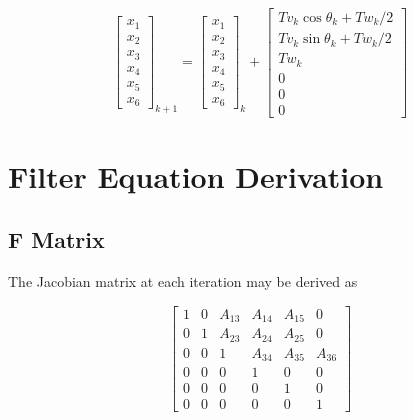 \documentclass[11pt]{amsart}
\begin{document}
\begin{equation}
\begin{bmatrix}
x_1 \\ x_2 \\ x_3 \\ x_4 \\ x_5 \\ x_6 
\end{bmatrix}_{k+1} = 
\begin{bmatrix}
x_1 \\ x_2 \\ x_3 \\ x_4 \\ x_5 \\ x_6 
\end{bmatrix}_{k} +
\begin{bmatrix}
T v_k \cos{\theta_k + T w_k/2} \\
T v_k \sin{\theta_k + T w_k/2} \\
T w_k \\ 0 \\ 0 \\ 0
\end{bmatrix} 
 \end{equation}
 
 \newpage
\section{Filter Equation Derivation}
\subsection{F Matrix}
The Jacobian matrix at each iteration may be derived as

\begin{equation}
\begin{bmatrix}
1 & 0 & A_{13} & A_{14} & A_{15} & 0 \\
0 & 1 & A_{23} & A_{24} & A_{25} & 0 \\
0 & 0 & 1 & A_{34} & A_{35} & A_{36} \\
0 & 0 & 0 & 1 & 0 & 0 \\
0 & 0 & 0 & 0 & 1 & 0 \\
0 & 0 & 0 & 0 & 0 & 1 
\end{bmatrix}
\end{equation}
\end{document}
